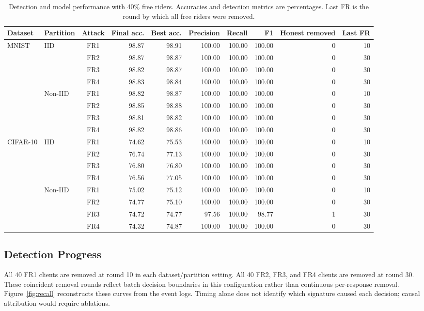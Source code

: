 \documentclass[conference]{IEEEtran}
\begin{document}
\begin{table}[t]
\centering\small
\caption{Detection and model performance with 40\% free riders. Accuracies and detection metrics are percentages. Last FR is the round by which all free riders were removed.}
\label{tab:results}
\begin{tabular}{llcrrrrrrr}
\toprule
Dataset & Partition & Attack & Final acc. & Best acc. & Precision & Recall & F1 & Honest removed & Last FR\\
\midrule
\multirow{8}{*}{MNIST} & \multirow{4}{*}{IID} & FR1 & 98.87 & 98.91 & 100.00 & 100.00 & 100.00 & 0 & 10 \\
 & & FR2 & 98.87 & 98.87 & 100.00 & 100.00 & 100.00 & 0 & 30 \\
 & & FR3 & 98.82 & 98.87 & 100.00 & 100.00 & 100.00 & 0 & 30 \\
 & & FR4 & 98.83 & 98.84 & 100.00 & 100.00 & 100.00 & 0 & 30 \\
\cmidrule(lr){2-10}
 & \multirow{4}{*}{Non-IID} & FR1 & 98.82 & 98.87 & 100.00 & 100.00 & 100.00 & 0 & 10 \\
 & & FR2 & 98.85 & 98.88 & 100.00 & 100.00 & 100.00 & 0 & 30 \\
 & & FR3 & 98.81 & 98.82 & 100.00 & 100.00 & 100.00 & 0 & 30 \\
 & & FR4 & 98.82 & 98.86 & 100.00 & 100.00 & 100.00 & 0 & 30 \\
\midrule
\multirow{8}{*}{CIFAR-10} & \multirow{4}{*}{IID} & FR1 & 74.62 & 75.53 & 100.00 & 100.00 & 100.00 & 0 & 10 \\
 & & FR2 & 76.74 & 77.13 & 100.00 & 100.00 & 100.00 & 0 & 30 \\
 & & FR3 & 76.80 & 76.80 & 100.00 & 100.00 & 100.00 & 0 & 30 \\
 & & FR4 & 76.56 & 77.05 & 100.00 & 100.00 & 100.00 & 0 & 30 \\
\cmidrule(lr){2-10}
 & \multirow{4}{*}{Non-IID} & FR1 & 75.02 & 75.12 & 100.00 & 100.00 & 100.00 & 0 & 10 \\
 & & FR2 & 74.77 & 75.10 & 100.00 & 100.00 & 100.00 & 0 & 30 \\
 & & FR3 & 74.72 & 74.77 & 97.56 & 100.00 & 98.77 & 1 & 30 \\
 & & FR4 & 74.32 & 74.87 & 100.00 & 100.00 & 100.00 & 0 & 30 \\
\bottomrule\end{tabular}\end{table}

\subsection{Detection Progress}
All 40 FR1 clients are removed at round 10 in each dataset/partition setting. All 40 FR2, FR3, and FR4 clients are removed at round 30. These coincident removal rounds reflect batch decision boundaries in this configuration rather than continuous per-response removal. Figure~\ref{fig:recall} reconstructs these curves from the event logs. Timing alone does not identify which signature caused each decision; causal attribution would require ablations.
\end{document}
